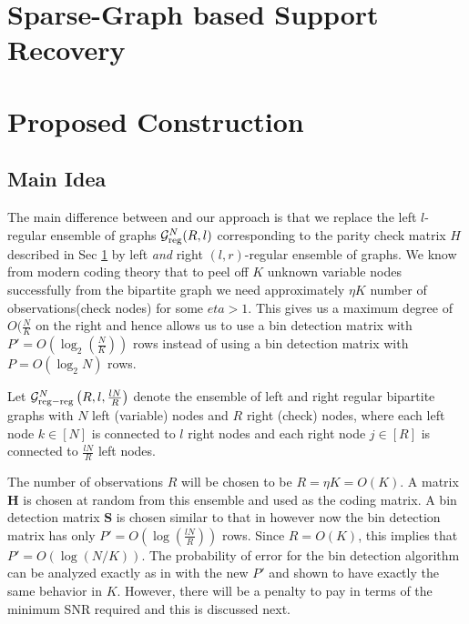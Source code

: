 \documentclass[conference]{IEEEtran}
\begin{document}
\section{Sparse-Graph based Support Recovery}\label{Sec:Review}
\section{Proposed Construction}

\subsection{Main Idea}
The main difference between \cite{li2015subdraft} and our approach is that we replace the left $l$-regular ensemble of graphs $\mathcal{G}^N_{\rm reg}(R,l)$ corresponding to the parity check matrix $H$ described in Sec \ref{Sec:Review} by left {\em and} right $\left(l, r\right)$-regular ensemble of graphs. We know from modern coding theory that to peel off $K$ unknown variable nodes successfully from the bipartite graph we need approximately $\eta K$ number of observations(check nodes) for some $eta>1$. This gives us a maximum degree of $O(\frac{N}{K}$ on the right and hence allows us to use a bin detection matrix with $P' = O\left(\log_2 \left( \frac{N}{K} \right)\right)$ rows instead of using a bin detection matrix with $P = O(\log_2 N)$ rows.

\begin{definition}\label{def:leftandrighreg}
Let $\mathcal{G}^N_{\rm reg-reg}\left(R,l, \frac{lN}{R} \right)$ denote the ensemble of left and right regular bipartite graphs with $N$ left (variable) nodes and $R$ right (check) nodes, where each left node $k \in [N]$ is connected to $l$ right nodes and each right node $j \in [R]$ is connected to $\frac{lN}{R}$ left nodes.
\end{definition}

The number of observations $R$ will be chosen to be $R = \eta K = O(K)$. A matrix $\mathbf{H}$ is chosen at random from this ensemble and used as the coding matrix. A bin detection matrix $\mathbf{S}$ is chosen similar to that in \cite{li2015subdraft} however now the bin detection matrix has only $P' = O\left(\log (\frac{lN}{R})\right)$ rows. Since $R = O(K)$, this implies that $P' = O(\log(N/K))$. The probability of error for the bin detection algorithm can be analyzed exactly as in \cite{li2015subdraft} with the new $P'$ and shown to have exactly the same behavior in $K$. However, there will be a penalty to pay in terms of the minimum SNR required and this is discussed next.
\end{document}
